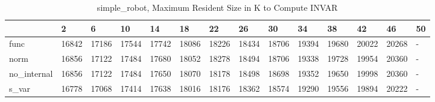 \begin{table}
\caption{simple_robot, Maximum Resident Size in K to Compute INVAR}
\label{simple_robot_INVAR_size}
\begin{tabular}{llllllllllllll}
\toprule
 & 2 & 6 & 10 & 14 & 18 & 22 & 26 & 30 & 34 & 38 & 42 & 46 & 50 \\
\midrule
func & 16842 & 17186 & 17544 & 17742 & 18086 & 18226 & 18434 & 18706 & 19394 & 19680 & 20022 & 20268 & - \\
norm & 16856 & 17122 & 17484 & 17680 & 18052 & 18278 & 18494 & 18706 & 19338 & 19728 & 19954 & 20360 & - \\
no_internal & 16856 & 17122 & 17484 & 17650 & 18070 & 18178 & 18498 & 18698 & 19352 & 19650 & 19998 & 20360 & - \\
s_var & 16778 & 17068 & 17414 & 17638 & 18016 & 18176 & 18362 & 18574 & 19290 & 19556 & 19894 & 20222 & - \\
\bottomrule
\end{tabular}
\end{table}
